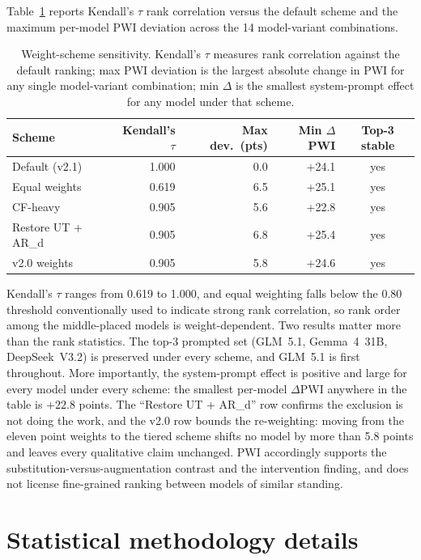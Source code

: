 \documentclass{article}
\begin{document}
Table~\ref{tab:sensitivity} reports Kendall's $\tau$ rank correlation versus the default scheme and the maximum per-model PWI deviation across the 14 model-variant combinations.

\begin{table}[h]
\centering
\caption{Weight-scheme sensitivity. Kendall's $\tau$ measures rank correlation against the default ranking; max PWI deviation is the largest absolute change in PWI for any single model-variant combination; min $\Delta$ is the smallest system-prompt effect for any model under that scheme.}
\label{tab:sensitivity}
\small
\begin{tabular}{lrrrc}
\toprule
\textbf{Scheme} & \textbf{Kendall's $\tau$} & \textbf{Max dev.\ (pts)} & \textbf{Min $\Delta$PWI} & \textbf{Top-3 stable} \\
\midrule
Default (v2.1)      & 1.000 & 0.0 & +24.1 & yes \\
Equal weights       & 0.619 & 6.5 & +25.1 & yes \\
CF-heavy            & 0.905 & 5.6 & +22.8 & yes \\
Restore UT + AR\_d  & 0.905 & 6.8 & +25.4 & yes \\
v2.0 weights        & 0.905 & 5.8 & +24.6 & yes \\
\bottomrule
\end{tabular}
\end{table}

Kendall's $\tau$ ranges from 0.619 to 1.000, and equal weighting falls below the 0.80 threshold conventionally used to indicate strong rank correlation, so rank order among the middle-placed models is weight-dependent. Two results matter more than the rank statistics. The top-3 prompted set (GLM~5.1, Gemma~4~31B, DeepSeek~V3.2) is preserved under every scheme, and GLM~5.1 is first throughout. More importantly, the system-prompt effect is positive and large for every model under every scheme: the smallest per-model $\Delta$PWI anywhere in the table is $+22.8$ points. The ``Restore UT + AR\_d'' row confirms the exclusion is not doing the work, and the v2.0 row bounds the re-weighting: moving from the eleven point weights to the tiered scheme shifts no model by more than 5.8 points and leaves every qualitative claim unchanged. PWI accordingly supports the substitution-versus-augmentation contrast and the intervention finding, and does not license fine-grained ranking between models of similar standing.

\section{Statistical methodology details}
\label{app:stats}
\end{document}
